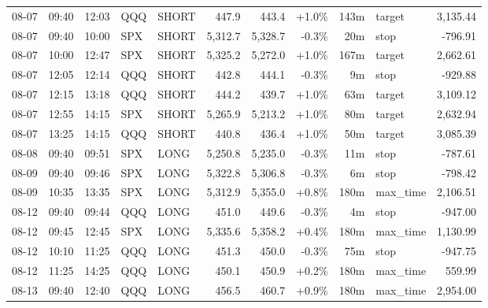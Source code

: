 \documentclass[11pt,a4paper,twoside]{article}
\begin{document}
\begin{center}
\begin{longtable}{>{\color{txtmain}}l l l l l r r r r >{\color{txtmain}}l r}
08-07 & 09:40 & 12:03 & QQQ & SHORT & 447.9 & 443.4 & \textcolor{wingreen}{+1.0\%} & 143m & target & \textcolor{wingreen}{3,135.44} \\
08-07 & 09:40 & 10:00 & SPX & SHORT & 5,312.7 & 5,328.7 & \textcolor{lossred}{-0.3\%} & 20m & stop & \textcolor{lossred}{-796.91} \\
08-07 & 10:00 & 12:47 & SPX & SHORT & 5,325.2 & 5,272.0 & \textcolor{wingreen}{+1.0\%} & 167m & target & \textcolor{wingreen}{2,662.61} \\
08-07 & 12:05 & 12:14 & QQQ & SHORT & 442.8 & 444.1 & \textcolor{lossred}{-0.3\%} & 9m & stop & \textcolor{lossred}{-929.88} \\
08-07 & 12:15 & 13:18 & QQQ & SHORT & 444.2 & 439.7 & \textcolor{wingreen}{+1.0\%} & 63m & target & \textcolor{wingreen}{3,109.12} \\
08-07 & 12:55 & 14:15 & SPX & SHORT & 5,265.9 & 5,213.2 & \textcolor{wingreen}{+1.0\%} & 80m & target & \textcolor{wingreen}{2,632.94} \\
08-07 & 13:25 & 14:15 & QQQ & SHORT & 440.8 & 436.4 & \textcolor{wingreen}{+1.0\%} & 50m & target & \textcolor{wingreen}{3,085.39} \\
08-08 & 09:40 & 09:51 & SPX & LONG & 5,250.8 & 5,235.0 & \textcolor{lossred}{-0.3\%} & 11m & stop & \textcolor{lossred}{-787.61} \\
08-09 & 09:40 & 09:46 & SPX & LONG & 5,322.8 & 5,306.8 & \textcolor{lossred}{-0.3\%} & 6m & stop & \textcolor{lossred}{-798.42} \\
08-09 & 10:35 & 13:35 & SPX & LONG & 5,312.9 & 5,355.0 & \textcolor{wingreen}{+0.8\%} & 180m & max\_time & \textcolor{wingreen}{2,106.51} \\
08-12 & 09:40 & 09:44 & QQQ & LONG & 451.0 & 449.6 & \textcolor{lossred}{-0.3\%} & 4m & stop & \textcolor{lossred}{-947.00} \\
08-12 & 09:45 & 12:45 & SPX & LONG & 5,335.6 & 5,358.2 & \textcolor{wingreen}{+0.4\%} & 180m & max\_time & \textcolor{wingreen}{1,130.99} \\
08-12 & 10:10 & 11:25 & QQQ & LONG & 451.3 & 450.0 & \textcolor{lossred}{-0.3\%} & 75m & stop & \textcolor{lossred}{-947.75} \\
08-12 & 11:25 & 14:25 & QQQ & LONG & 450.1 & 450.9 & \textcolor{wingreen}{+0.2\%} & 180m & max\_time & \textcolor{wingreen}{559.99} \\
08-13 & 09:40 & 12:40 & QQQ & LONG & 456.5 & 460.7 & \textcolor{wingreen}{+0.9\%} & 180m & max\_time & \textcolor{wingreen}{2,954.00} \\

\end{longtable}
\end{center}
\end{document}
